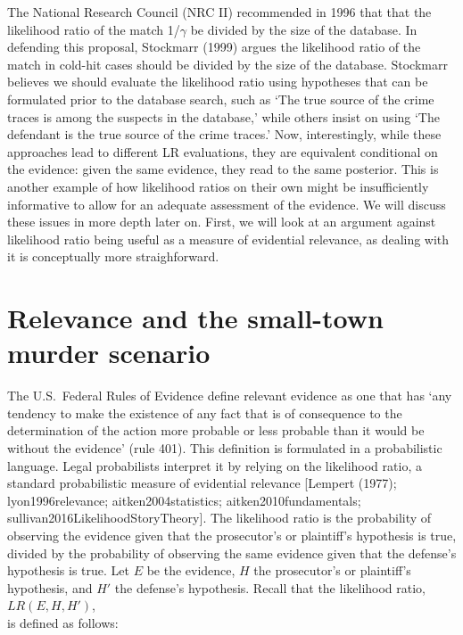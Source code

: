 \documentclass[10pt,dvipsnames,enabledeprecatedfontcommands]{scrartcl}
\begin{document}
The National Research Council (NRC II) recommended in 1996 that that the
likelihood ratio of the match 1/\(\gamma\) be divided by the size of the
database. In defending this proposal, Stockmarr (1999) argues the
likelihood ratio of the match in cold-hit cases should be divided by the
size of the database. Stockmarr believes we should evaluate the
likelihood ratio using hypotheses that can be formulated prior to the
database search, such as `The true source of the crime traces is among
the suspects in the database,' while others insist on using `The
defendant is the true source of the crime traces.' Now, interestingly,
while these approaches lead to different LR evaluations, they are
equivalent conditional on the evidence: given the same evidence, they
read to the same posterior. This is another example of how likelihood
ratios on their own might be insufficiently informative to allow for an
adequate assessment of the evidence. We will discuss these issues in
more depth later on. First, we will look at an argument against
likelihood ratio being useful as a measure of evidential relevance, as
dealing with it is conceptually more straighforward.


\section{\texorpdfstring{Relevance and the small-town murder scenario
\label{sec:relevance}}{Relevance and the small-town murder scenario }}\label{relevance-and-the-small-town-murder-scenario}

The U.S.~Federal Rules of Evidence define relevant evidence as one that
has `any tendency to make the existence of any fact that is of
consequence to the determination of the action more probable or less
probable than it would be without the evidence' (rule 401). This
definition is formulated in a probabilistic language. Legal probabilists
interpret it by relying on the likelihood ratio, a standard
probabilistic measure of evidential relevance {[}Lempert (1977);
lyon1996relevance; aitken2004statistics; aitken2010fundamentals;
sullivan2016LikelihoodStoryTheory{]}. The likelihood ratio is the
probability of observing the evidence given that the prosecutor's or
plaintiff's hypothesis is true, divided by the probability of observing
the same evidence given that the defense's hypothesis is true. Let \(E\)
be the evidence, \(H\) the prosecutor's or plaintiff's hypothesis, and
\(H'\) the defense's hypothesis. Recall that the likelihood ratio,
\(LR(E, H, H')\),\\
is defined as follows:
\end{document}
